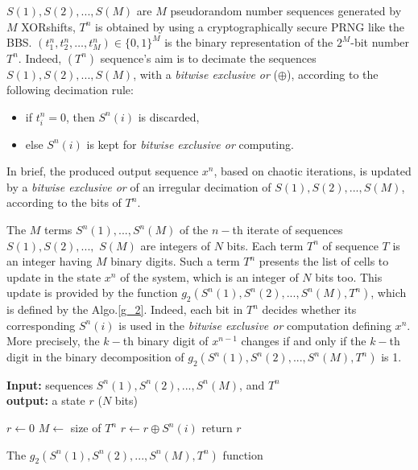 $S(1), S(2), ..., S(M)$ are $M$ pseudorandom number sequences generated by $M$ XORshifts, $T^n$ is obtained by using a cryptographically secure
PRNG like the BBS. $(t_1^n,t_2^n,\dots,t_M^n)\in \{0,1\}^M$ is the binary representation of the $2^M$-bit number $T^n$.
Indeed, $(T^n)$ sequence's aim is to decimate
the sequences %
$S(1),S(2),..., S(M)$, with a \emph{bitwise exclusive or} ($\oplus$), according to the following decimation rule:
\begin{itemize}
\item if $t^n_i = 0$, then $S^n(i)$ is discarded,
\item else $S^n(i)$ is kept for \emph{bitwise exclusive or} computing.
\end{itemize}
In brief, the produced output sequence $x^n$, based on chaotic iterations, is updated by a \emph{bitwise exclusive or} of an irregular decimation of $S(1), S(2), ..., S(M)$, according to the bits of $T^n$.


The $M$ terms $S^n(1),..., S^n(M)$ of 
the $n-$th iterate of sequences $S(1), S(2), ...,$ $S(M)$
are integers of $N$ bits. 
Each term $T^n$ of sequence $T$ is an integer having 
$M$ binary digits. 
Such a term $T^n$ presents the list of cells 
to update in the state $x^n$ of the system, which is an integer of $N$ bits too. 
This update is provided by the function $g_2(S^n(1),S^n(2), ..., S^n(M),T^n)$, 
which is defined by the Algo.\ref{g_2}. 
Indeed, each bit in $T^n$ decides whether its 
corresponding $S^n(i)$ is used in the \emph{bitwise exclusive or} computation defining $x^n$. 
More precisely, 
the $k-$th binary digit of $x^{n-1}$ changes if and only if 
the $k-$th digit in the binary decomposition of 
$g_2(S^n(1),S^n(2), ..., S^n(M),T^n)$ is 1.



\begin{algorithm}
\textbf{Input:} sequences $S^n(1), S^n(2), ..., S^n(M)$, and $T^n$\\
\textbf{output:} a state $r$ ($N$ bits)\\
\begin{algorithmic}[1]
\STATE$r \leftarrow 0 $\;
\STATE$M \leftarrow$ size of $T^n$ \;
\;
{
\STATE $r \leftarrow r \oplus S^n(i)$\;
}\ENDIF
\ENDFOR
\STATE return $r$\;
\medskip
\caption{The $g_2(S^n(1),S^n(2),...,S^n(M),T^n)$ function}
\label{g_2}
\end{algorithmic}
\end{algorithm}


